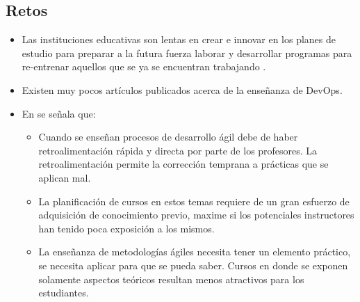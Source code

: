 \documentclass[journal]{IEEEtran}
\begin{document}
\subsection{Retos} \label{sec:retos}
\begin{itemize}

    \item Las instituciones educativas son lentas en crear e innovar en los planes de estudio para preparar a la futura fuerza laborar y desarrollar programas para re-entrenar aquellos que se ya se encuentran trabajando \cite{cenfotec-2}.
    \item Existen muy pocos artículos publicados acerca de la enseñanza de DevOps\cite{henrik-b}.
    \item En \cite{steghoger-et-al} se señala que:
        \begin{itemize}
            \item Cuando se enseñan procesos de desarrollo ágil debe de haber retroalimentación rápida y directa por parte de los profesores. La retroalimentación permite la corrección temprana a prácticas que se aplican mal.
            \item La planificación de cursos en estos temas requiere de un gran esfuerzo de adquisición de conocimiento previo, maxime si los potenciales instructores han tenido poca exposición a los mismos.
            \item La enseñanza de metodologías ágiles necesita tener un elemento práctico, se necesita aplicar para que se pueda saber. Cursos en donde se exponen solamente aspectos teóricos resultan menos atractivos para los estudiantes. 
        \end{itemize} 
        

\end{itemize}
\end{document}
